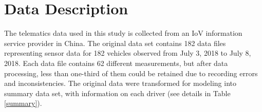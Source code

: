 \documentclass[num-refs]{wiley-article}
\begin{document}
\section{Data Description}
The telematics data used in this study is collected from an IoV information service provider in China. The original data set contains 182 data files representing sensor data for 182 vehicles observed from July 3, 2018 to July 8, 2018\cite{sun2020assessing}. Each data file contains 62 different measurements, but after data processing\cite{sun2019cleaning}, less than one-third of them could be retained due to recording errors and inconsistencies. The original data were transformed for modeling into summary data set, with  information on each driver (see details in Table \ref{summary}). 

\begin{table}[htbp]
\caption{Descriptive statistics of the summary data set for 182 drivers observed from July 3 to July 8 2018..}
\label{summary}
\end{table}
\end{document}
